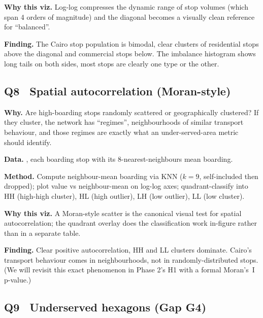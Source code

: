 \textbf{Why this viz.} Log-log compresses the dynamic range of stop
volumes (which span 4 orders of magnitude) and the diagonal becomes a
visually clean reference for ``balanced''.

\textbf{Finding.} The Cairo stop population is bimodal, clear
clusters of residential stops above the diagonal and commercial stops
below. The imbalance histogram shows long tails on both sides, most
stops are clearly one type or the other.

\subsection{Q8 \textbullet\ Spatial autocorrelation (Moran-style)}

\textbf{Why.} Are high-boarding stops randomly scattered or
geographically clustered? If they cluster, the network has
``regimes'', neighbourhoods of similar transport behaviour, and
those regimes are exactly what an under-served-area metric should
identify.

\textbf{Data.} , each boarding
stop with its 8-nearest-neighbours mean boarding.

\textbf{Method.} Compute neighbour-mean boarding via KNN ($k=9$,
self-included then dropped); plot value vs neighbour-mean on log-log
axes; quadrant-classify into HH (high-high cluster), HL (high outlier),
LH (low outlier), LL (low cluster).


\textbf{Why this viz.} A Moran-style scatter is the canonical visual
test for spatial autocorrelation; the quadrant overlay does the
classification work in-figure rather than in a separate table.

\textbf{Finding.} Clear positive autocorrelation, HH and LL clusters
dominate. Cairo's transport behaviour comes in neighbourhoods, not in
randomly-distributed stops. (We will revisit this exact phenomenon in
Phase 2's H1 with a formal Moran's~I p-value.)

\subsection{Q9 \textbullet\ Underserved hexagons (Gap G4)}

